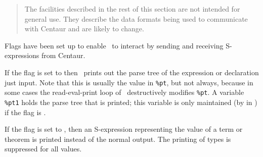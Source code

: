 \begin{center}\it
\begin{quote}
The facilities described in the rest of this section are not intended
for general use. They describe the data formats being used to
communicate with Centaur and are likely to change.
\end{quote}
\end{center}

Flags have been set up to enable \HOL\ to interact by sending and
receiving S-expressions from Centaur.

If the flag  is set to  then \ML\ prints out the
parse tree of the expression or declaration just input. Note that this
is usually the value in {\small\verb+%pt+}, 
but not always, because in some cases the
read-eval-print loop of \ML\ destructively modifies {\small\verb+%pt+}. 
A variable {\small\verb+%pt1+}
holds the parse tree that is printed; this variable is only maintained
(by  in ) if the flag  
is .

If the flag  is set to , then an S-expression
representing the value of a term or theorem is printed instead of the
normal output.  The printing of types is suppressed for all values.

